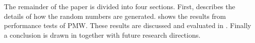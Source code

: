 The remainder of the paper is divided into four sections.
First,  describes the details of how the random numbers are generated.
 shows the results from performance tests of PMW.
These results are discussed and evaluated in .
Finally a conclusion is drawn in  together with future research directions.

